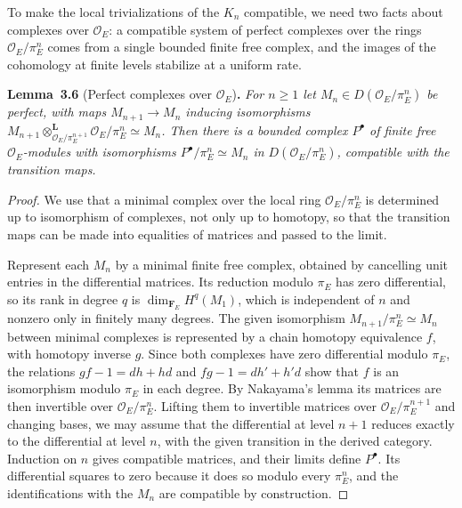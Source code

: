 \documentclass[11pt]{article}
\newenvironment{bpstatement}[2]{\par\addvspace{0.6\baselineskip}\noindent\textbf{#1}#2\textbf{.}\enspace\ignorespaces}
  {\par\addvspace{0.4\baselineskip}}
\newenvironment{bpstatementit}[2]{\begin{bpstatement}{#1}{#2}\itshape\ignorespaces}{\end{bpstatement}}
\begin{document}
\label{bp18}%
To make the local trivializations of the \(K_n\) compatible, we need two facts about complexes over \(\mathcal O_E\): a compatible system of perfect complexes over the rings \(\mathcal O_E/\pi_E^n\) comes from a single bounded finite free complex, and the images of the cohomology at finite levels stabilize at a uniform rate.

\label{bp19}%
\begin{bpstatementit}{Lemma~3.6}{ (Perfect complexes over $\mathcal O_E$)}
For \(n\ge1\) let \(M_n\in D(\mathcal O_E/\pi_E^n)\) be perfect, with maps \(M_{n+1}\to M_n\) inducing isomorphisms \(M_{n+1}\otimes^{\mathbf L}_{\mathcal O_E/\pi_E^{n+1}}\mathcal O_E/\pi_E^n\simeq M_n\). Then there is a bounded complex \(P^\bullet\) of finite free \(\mathcal O_E\)-modules with isomorphisms \(P^\bullet/\pi_E^n\simeq M_n\) in \(D(\mathcal O_E/\pi_E^n)\), compatible with the transition maps.
\end{bpstatementit}

\begin{proof}[{Proof}]\label{bp20}%
We use that a minimal complex over the local ring \(\mathcal O_E/\pi_E^n\) is determined up to isomorphism of complexes, not only up to homotopy, so that the transition maps can be made into equalities of matrices and passed to the limit.

Represent each \(M_n\) by a minimal finite free complex, obtained by cancelling unit entries in the differential matrices. Its reduction modulo \(\pi_E\) has zero differential, so its rank in degree \(q\) is \(\dim_{\mathbf F_E}H^q(M_1)\), which is independent of \(n\) and nonzero only in finitely many degrees. The given isomorphism \(M_{n+1}/\pi_E^n\simeq M_n\) between minimal complexes is represented by a chain homotopy equivalence \(f\), with homotopy inverse \(g\). Since both complexes have zero differential modulo \(\pi_E\), the relations \(gf-1=dh+hd\) and \(fg-1=dh'+h'd\) show that \(f\) is an isomorphism modulo \(\pi_E\) in each degree. By Nakayama's lemma its matrices are then invertible over \(\mathcal O_E/\pi_E^n\). Lifting them to invertible matrices over \(\mathcal O_E/\pi_E^{n+1}\) and changing bases, we may assume that the differential at level \(n+1\) reduces exactly to the differential at level \(n\), with the given transition in the derived category. Induction on \(n\) gives compatible matrices, and their limits define \(P^\bullet\). Its differential squares to zero because it does so modulo every \(\pi_E^n\), and the identifications with the \(M_n\) are compatible by construction.
\end{proof}
\end{document}
